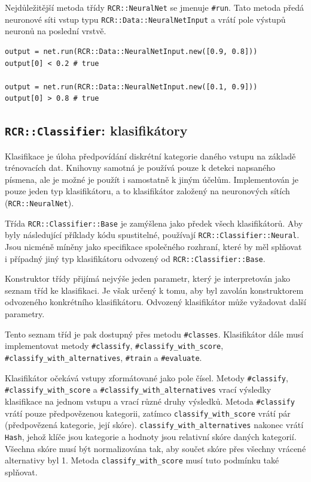 \documentclass[a4paper]{article}
\begin{document}
Nejdůležitější metoda třídy \texttt{RCR::NeuralNet} se jmenuje \texttt{\#run}.
Tato metoda předá neuronové síti vstup typu \texttt{RCR::Data::NeuralNetInput} a
vrátí pole výstupů neuronů na poslední vrstvě.
\begin{lstlisting}
output = net.run(RCR::Data::NeuralNetInput.new([0.9, 0.8]))
output[0] < 0.2 # true

output = net.run(RCR::Data::NeuralNetInput.new([0.1, 0.9]))
output[0] > 0.8 # true
\end{lstlisting}


\subsection{\texttt{RCR::Classifier}: klasifikátory}

Klasifikace je úloha předpovídání diskrétní kategorie daného vstupu na základě
trénovacích dat. Knihovny samotná je používá pouze k detekci napsaného písmena,
ale je možné je použít i samostatně k jiným účelům. Implementován je pouze jeden
typ klasifikátoru, a to klasifikátor založený na neuronových sítích
(\texttt{RCR::NeuralNet}).

Třída \texttt{RCR::Classifier::Base} je zamýšlena jako předek všech
klasifikátorů. Aby byly následující příklady
kódu spustitelné, používají \texttt{RCR::Classifier::Neural}. Jsou nicméně
míněny jako specifikace společného rozhraní, které by měl splňovat i případný
jiný typ klasifikátoru odvozený od \texttt{RCR::Classifier::Base}.

Konstruktor třídy přijímá nejvýše jeden parametr, který je
interpretován jako seznam tříd ke klasifikaci. Je však určený k tomu,
aby byl zavolán konstruktorem odvozeného konkrétního klasifikátoru.
Odvozený klasifikátor může vyžadovat další parametry.

Tento seznam tříd je pak dostupný přes metodu \texttt{\#classes}.
Klasifikátor dále musí implementovat metody \texttt{\#classify},
\texttt{\#classify\_with\_score}, \texttt{\#classify\_with\_alternatives},
\texttt{\#train} a \texttt{\#evaluate}.

Klasifikátor očekává vstupy zformátované jako pole čísel.
Metody \texttt{\#classify}, \texttt{\#classify\_with\_score} a
\texttt{\#classify\_with\_alternatives} vrací výsledky klasifikace
na jednom vstupu a vrací různé druhy výsledků. Metoda \texttt{\#classify}
vrátí pouze předpovězenou kategorii, zatímco \texttt{classify\_with\_score}
vrátí pár (předpovězená kategorie, její skóre).
\texttt{classify\_with\_alternatives} nakonec vrátí \texttt{Hash}, jehož
klíče jsou kategorie a hodnoty jsou relativní skóre daných kategorií.
Všechna skóre musí být normalizována tak, aby součet skóre přes všechny
vrácené alternativy byl 1. Metoda \texttt{classify\_with\_score} musí
tuto podmínku také splňovat.
\end{document}
